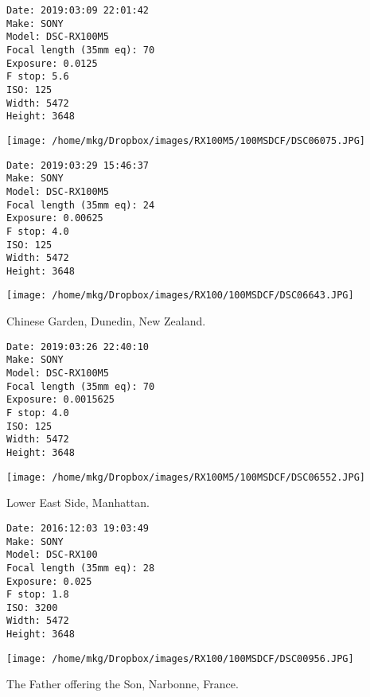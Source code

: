 \begin{lstlisting}
Date: 2019:03:09 22:01:42
Make: SONY
Model: DSC-RX100M5
Focal length (35mm eq): 70
Exposure: 0.0125
F stop: 5.6
ISO: 125
Width: 5472
Height: 3648

\end{lstlisting}

\clearpage
\texttt{[image: /home/mkg/Dropbox/images/RX100M5/100MSDCF/DSC06075.JPG]}

\clearpage

\noindent 

\begin{lstlisting}
Date: 2019:03:29 15:46:37
Make: SONY
Model: DSC-RX100M5
Focal length (35mm eq): 24
Exposure: 0.00625
F stop: 4.0
ISO: 125
Width: 5472
Height: 3648

\end{lstlisting}

\clearpage
\texttt{[image: /home/mkg/Dropbox/images/RX100/100MSDCF/DSC06643.JPG]}

\clearpage

\noindent Chinese Garden, Dunedin, New Zealand.

\begin{lstlisting}
Date: 2019:03:26 22:40:10
Make: SONY
Model: DSC-RX100M5
Focal length (35mm eq): 70
Exposure: 0.0015625
F stop: 4.0
ISO: 125
Width: 5472
Height: 3648

\end{lstlisting}

\clearpage
\texttt{[image: /home/mkg/Dropbox/images/RX100M5/100MSDCF/DSC06552.JPG]}

\clearpage

\noindent Lower East Side, Manhattan.

\begin{lstlisting}
Date: 2016:12:03 19:03:49
Make: SONY
Model: DSC-RX100
Focal length (35mm eq): 28
Exposure: 0.025
F stop: 1.8
ISO: 3200
Width: 5472
Height: 3648

\end{lstlisting}

\clearpage
\texttt{[image: /home/mkg/Dropbox/images/RX100/100MSDCF/DSC00956.JPG]}

\clearpage

\noindent The Father offering the Son, Narbonne, France.

